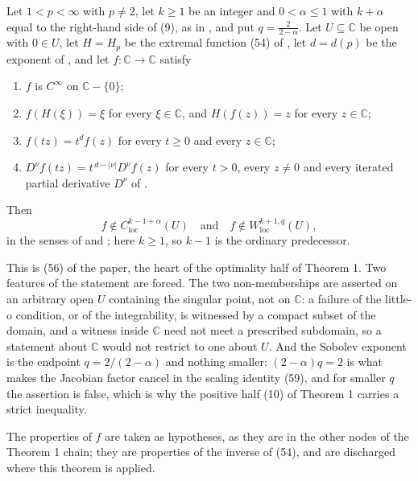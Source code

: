 \begin{theorem}
Let $1<p<\infty$ with $p\neq2$, let $k\ge1$ be an integer and
$0<\alpha\le1$ with $k+\alpha$ equal to the right-hand side of (9), as in
, and put $q=\frac{2}{2-\alpha}$.  Let
$U\subseteq\mathbb{C}$ be open with $0\in U$, let $H=H_p$ be the extremal
function (54) of , let $d=d(p)$ be the exponent of
, and let $f\colon\mathbb{C}\to\mathbb{C}$ satisfy
\begin{enumerate}
\item[(H1)] $f$ is $C^\infty$ on $\mathbb{C}-\{0\}$;
\item[(H2)] $f(H(\xi))=\xi$ for every $\xi\in\mathbb{C}$, and $H(f(z))=z$ for
  every $z\in\mathbb{C}$;
\item[(H3)] $f(tz)=t^{d}f(z)$ for every $t\ge0$ and every $z\in\mathbb{C}$;
\item[(H4)] $D^\nu f(tz)=t^{\,d-|\nu|}D^\nu f(z)$ for every $t>0$, every
  $z\neq0$ and every iterated partial derivative $D^\nu$ of
  .
\end{enumerate}
Then
\[
  f\notin C^{k-1+\alpha}_{\mathrm{loc}}(U)
  \quad\text{and}\quad
  f\notin W^{k+1,q}_{\mathrm{loc}}(U),
\]
in the senses of  and ; here
$k\ge1$, so $k-1$ is the ordinary predecessor.

This is (56) of the paper, the heart of the optimality half of Theorem 1.  Two
features of the statement are forced.  The two non-memberships are asserted on
an arbitrary open $U$ containing the singular point, not on $\mathbb{C}$: a
failure of the little-o condition, or of the integrability, is witnessed by a
compact subset of the domain, and a witness inside $\mathbb{C}$ need not meet a
prescribed subdomain, so a statement about $\mathbb{C}$ would not restrict to
one about $U$.  And the Sobolev exponent is the endpoint $q=2/(2-\alpha)$ and
nothing smaller: $(2-\alpha)q=2$ is what makes the Jacobian factor cancel in
the scaling identity (59), and for smaller $q$ the assertion is false, which is
why the positive half (10) of Theorem 1 carries a strict inequality.

The properties of $f$ are taken as hypotheses, as they are in the other nodes
of the Theorem 1 chain; they are properties of the inverse of (54), and are
discharged where this theorem is applied.
\end{theorem}
